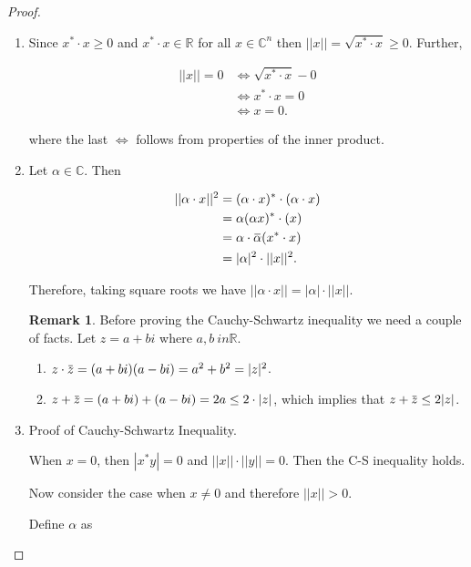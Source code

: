 \documentclass[12pt]{article}
\newcommand{\overbar}[1]{\mkern 1.5mu\overline{\mkern-1.5mu#1\mkern-1.5mu}\mkern 1.5mu}
\theoremstyle{definition}
\newtheorem*{remark}{Remark}
\begin{document}
\begin{proof}

\begin{enumerate}[label = (\arabic*)]
\item Since $x^* \cdot x \geq 0$ and $x^* \cdot x \in \mathbb{R}$ for all
$x \in \mathbb{C}^n$ then $||x|| = \sqrt{x^* \cdot x} \geq 0$. Further,

\begin{align*}
||x|| = 0 &\iff \sqrt{x^* \cdot x} - 0 \\
&\iff x^* \cdot x = 0 \\
&\iff x = 0.
\end{align*}

where the last $\iff$ follows from properties of the inner product.


\item Let $\alpha \in \mathbb{C}$. Then

\begin{align*}
||\alpha \cdot x ||^2 &= (\alpha \cdot x)^* \cdot (\alpha \cdot x) \\
&= \alpha (\alpha x)^* \cdot (x) \\
&= \alpha \cdot \overbar{\alpha} (x^* \cdot x) \\
&= |\alpha|^2 \cdot ||x||^2.
\end{align*}

Therefore, taking square roots we have $||\alpha \cdot x || = |\alpha| \cdot ||x||$.


\begin{remark}
Before proving the Cauchy-Schwartz inequality we need a couple of facts. Let $z = a + bi$
where $a, b \ in \mathbb{R}$.

\begin{enumerate}[label = (\roman*)]
\item $z \cdot \overbar{z} = (a + bi)(a - bi) = a^2 + b^2 = |z|^2$.
\item $z + \overbar{z} = (a + bi) + (a - bi) = 2a \leq 2 \cdot |z|$, which implies
that $z + \overbar{z} \leq 2|z|$.
\end{enumerate}
\end{remark}

\item Proof of Cauchy-Schwartz Inequality.

When $x = 0$, then $|x^* y| = 0$ and $||x|| \cdot ||y|| = 0$. Then the C-S inequality
holds.

Now consider the case when $x \neq 0$ and therefore $||x|| > 0$. 

Define $\alpha$ as


\end{enumerate}
\end{proof}
\end{document}
